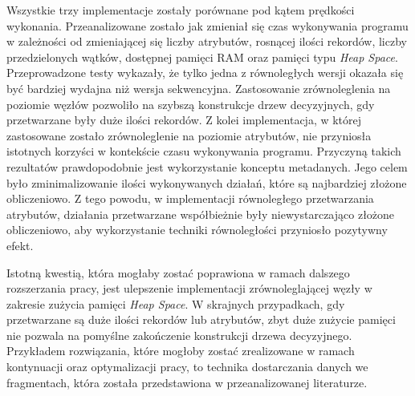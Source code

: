 \documentclass[12pt]{article}
\begin{document}
Wszystkie trzy implementacje zostały porównane pod kątem prędkości wykonania.
Przeanalizowane zostało jak zmieniał się czas wykonywania programu w zależności od zmieniającej się liczby atrybutów,
rosnącej ilości rekordów, liczby przedzielonych wątków, dostępnej pamięci RAM oraz pamięci typu \textit{Heap Space}.
Przeprowadzone testy wykazały, że tylko jedna z równoległych wersji okazała
się być bardziej wydajna niż wersja sekwencyjna. Zastosowanie zrównoleglenia
na poziomie węzłów pozwoliło na szybszą konstrukcje drzew decyzyjnych, gdy przetwarzane były duże ilości rekordów.
Z kolei implementacja, w której zastosowane zostało zrównoleglenie 
na poziomie atrybutów, nie przyniosła istotnych korzyści w kontekście czasu wykonywania programu.
Przyczyną takich rezultatów prawdopodobnie jest wykorzystanie konceptu metadanych.
Jego celem było zminimalizowanie ilości wykonywanych działań, które są najbardziej złożone obliczeniowo.
Z tego powodu, w implementacji równoległego przetwarzania atrybutów, działania przetwarzane współbieżnie
były niewystarczająco złożone obliczeniowo, aby wykorzystanie techniki równoległości przyniosło pozytywny efekt.

Istotną kwestią, która mogłaby zostać poprawiona w ramach dalszego rozszerzania pracy, jest ulepszenie implementacji zrównoleglającej węzły
w zakresie zużycia pamięci \textit{Heap Space}. W skrajnych przypadkach, gdy przetwarzane są duże ilości rekordów lub atrybutów,
zbyt duże zużycie pamięci nie pozwala na pomyślne zakończenie konstrukcji drzewa decyzyjnego. Przykładem rozwiązania, które
mogłoby zostać zrealizowane w ramach kontynuacji oraz optymalizacji pracy, to technika dostarczania danych
we fragmentach, która została przedstawiona w przeanalizowanej literaturze.
\newpage

\cleardoublepage
{}
{}
\listoftables

\listoffigures

\lstlistoflistings

\newpage
\end{document}
